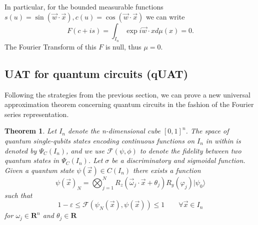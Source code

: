 \documentclass[aps,amssymb,amsmath,amsfonts,pra,superscriptaddress,onecolumn]{revtex4}
\newcommand{\ket}[1]{| #1 \rangle}
\newtheorem{theorem}{Theorem}
\begin{document}
In particular, for the bounded measurable functions $s(u) = \sin(\vec w \cdot \vec x), c(u) = \cos(\vec w \cdot \vec x)$ we can write
\begin{equation}
F(c + is) = \int_{I_n} \exp{i \vec w \cdot x} d\mu(x) = 0.
\end{equation}
The Fourier Transform of this $F$ is null, thus $\mu = 0$.

\subsection{UAT for quantum circuits (qUAT)} 
Following the strategies from the previous section, we can prove a new universal approximation theorem concerning quantum circuits in the fashion of the Fourier series representation. 
\begin{theorem}
Let $I_n$ denote the n-dimensional cube $[0, 1]^n$. The space of quantum single-qubits states encoding continuous functions on $I_n$ in within is denoted by $\Psi_C(I_n)$, and we use $\mathcal{F}(\psi, \phi)$ to denote the fidelity between two quantum states in $\Psi_C(I_n)$. 
Let $\sigma$ be a discriminatory and sigmoidal function. 
Given a quantum state $\psi(\vec x) \in C(I_n)$ there exists a function 
\begin{equation}\label{eq:qUAT}
    \psi(\vec x)_N = \bigotimes_{j=1}^N R_z(\vec \omega_j \cdot \vec x + \theta_j) R_y(\varphi_j)  \ket{\psi_0}
\end{equation}
such that 
\begin{equation}\label{eq:bound}
    1 - \varepsilon \leq \mathcal{F}(\psi_N(\vec x), \psi(\vec x)) \leq 1 \qquad \forall \vec x \in I_n
\end{equation}
for $\omega_j\in \mathbf{R}^n$ and $\theta_j \in \mathbf{R}$
\end{theorem}
\end{document}
